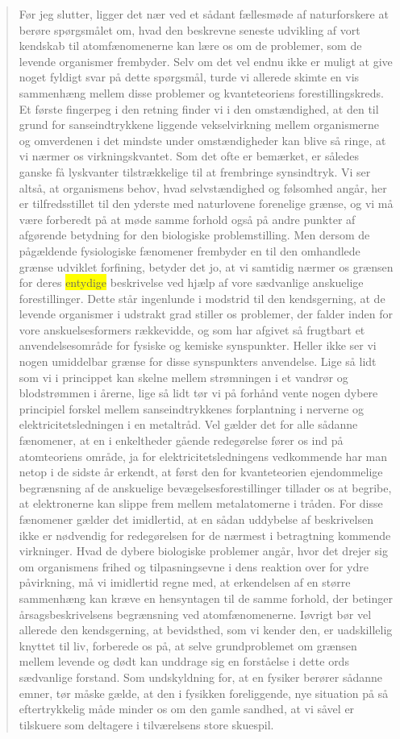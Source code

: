 \documentclass[11pt]{article}
\newcommand{\tlg}[1]{{\setlength{\fboxsep}{0.8pt}\colorbox{yellow}{#1}}}
\begin{document}
\begin{quote}
Før jeg slutter, ligger det nær ved et sådant fællesmøde af naturforskere at berøre spørgsmålet om, hvad den beskrevne seneste udvikling af vort kendskab til atomfænomenerne kan lære os om de problemer, som de levende organismer frembyder. Selv om det vel endnu ikke er muligt at give noget fyldigt svar på dette spørgsmål, turde vi allerede skimte en vis sammenhæng mellem disse problemer og kvanteteoriens forestillingskreds. Et første fingerpeg i den retning finder vi i den omstændighed, at den til grund for sanseindtrykkene liggende vekselvirkning mellem organismerne og omverdenen i det mindste under omstændigheder kan blive så ringe, at vi nærmer os virkningskvantet. Som det ofte er bemærket, er således ganske få lyskvanter tilstrækkelige til at frembringe synsindtryk. Vi ser altså, at organismens behov, hvad selvstændighed og følsomhed angår, her er tilfredsstillet til den yderste med naturlovene forenelige grænse, og vi må være forberedt på at møde samme forhold også på andre punkter af afgørende betydning for den biologiske problemstilling. Men dersom de pågældende fysiologiske fænomener frembyder en til den omhandlede grænse udviklet forfining, betyder det jo, at vi samtidig nærmer os grænsen for deres \tlg{entydige} beskrivelse ved hjælp af vore sædvanlige anskuelige forestillinger. Dette står ingenlunde i modstrid til den kendsgerning, at de levende organismer i udstrakt grad stiller os problemer, der falder inden for vore anskuelsesformers rækkevidde, og som har afgivet så frugtbart et anvendelsesområde for fysiske og kemiske synspunkter. Heller ikke ser vi nogen umiddelbar grænse for disse synspunkters anvendelse. Lige så lidt som vi i princippet kan skelne mellem strømningen i et vandrør og blodstrømmen i årerne, lige så lidt tør vi på forhånd vente nogen dybere principiel forskel mellem sanseindtrykkenes forplantning i nerverne og elektricitetsledningen i en metaltråd. Vel gælder det for alle sådanne fænomener, at en i enkeltheder gående redegørelse fører os ind på atomteoriens område, ja for elektricitetsledningens vedkommende har man netop i de sidste år erkendt, at først den for kvanteteorien ejendommelige begrænsning af de anskuelige bevægelsesforestillinger tillader os at begribe, at elektronerne kan slippe frem mellem metalatomerne i tråden. For disse fænomener gælder det imidlertid, at en sådan uddybelse af beskrivelsen ikke er nødvendig for redegørelsen for de nærmest i betragtning kommende virkninger. Hvad de dybere biologiske problemer angår, hvor det drejer sig om organismens frihed og tilpasningsevne i dens reaktion over for ydre påvirkning, må vi imidlertid regne med, at erkendelsen af en større sammenhæng kan kræve en hensyntagen til de samme forhold, der betinger årsagsbeskrivelsens begrænsning ved atomfænomenerne. Iøvrigt bør vel allerede den kendsgerning, at bevidsthed, som vi kender den, er uadskillelig knyttet til liv, forberede os på, at selve grundproblemet om grænsen mellem levende og dødt kan unddrage sig en forståelse i dette ords sædvanlige forstand. Som undskyldning for, at en fysiker berører sådanne emner, tør måske gælde, at den i fysikken foreliggende, nye situation på så eftertrykkelig måde minder os om den gamle sandhed, at vi såvel er tilskuere som deltagere i tilværelsens store skuespil.
\end{quote}
\end{document}
